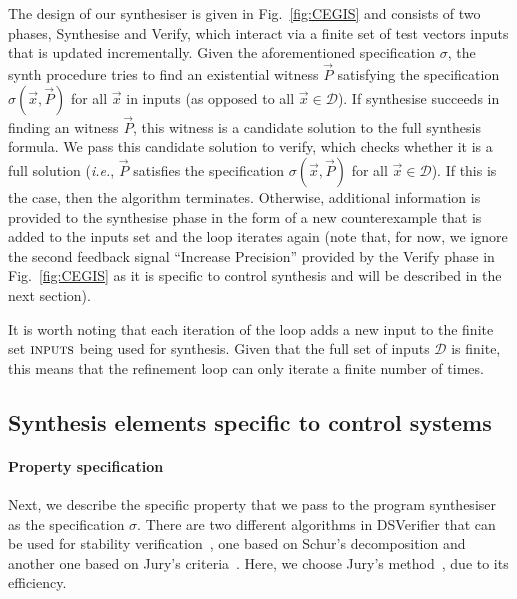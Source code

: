 \documentclass{sig-alternate-05-2015}
\newcommand{\blue}[1]{{\color{blue}#1}}
\begin{document}
The design of our synthesiser is given in Fig.~\ref{fig:CEGIS} and
consists of two phases, {\sc Synthesise} and {\sc Verify}, which
interact via a finite set of test vectors {\sc inputs} that is updated
incrementally.  Given the aforementioned specification $\sigma$, the
{\sc synth} procedure tries to find an existential witness $\vec{P}$
satisfying the specification $\sigma(\vec{x}, \vec{P})$ for all
$\vec{x}$ in {\sc inputs} (as opposed to all $\vec{x} \in \mathcal{D}$).
%
If {\sc synthesise} succeeds in finding an witness $\vec{P}$, this
witness is a candidate solution to the full synthesis formula. 
We pass this candidate solution to {\sc verify}, which 
checks whether it is a full solution ({\it i.e.}, $\vec{P}$
satisfies the specification $\sigma(\vec{x}, \vec{P})$ for all
$\vec{x}\in\mathcal{D}$).
%
If this is the case, then the algorithm terminates.
Otherwise, additional information is provided to the {\sc synthesise}
phase in the form of a new counterexample that is added to the {\sc inputs} set
and the loop iterates again (note that, for now, we ignore the 
second feedback signal ``Increase Precision'' provided by the {\sc Verify}
phase in Fig.~\ref{fig:CEGIS} as it is specific to control synthesis and will 
be described in the next section).


It is
worth noting that each iteration of the loop adds a new input to the
finite set $\text{\sc inputs}$ being used for synthesis.  Given that
the full set of inputs $\mathcal{D}$
is finite, this means that the refinement loop
can only iterate a finite number of times.

\subsection{Synthesis elements specific to control systems}
\label{synthesis-elements}

\paragraph{Property specification}
Next, we describe the specific property that we pass to the program
synthesiser as the specification $\sigma$.  There are two different
algorithms in DSVerifier that can be used for stability
verification~\cite{daes20161,Bessa16}, one based on
Schur's decomposition and another one based on Jury's
criteria~\cite{astrom1997computer}.  Here, we choose Jury's
method~\cite{astrom1997computer}, due to its efficiency.
\end{document}
